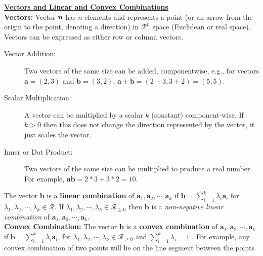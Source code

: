 %

\underline{\bf Vectors and Linear and Convex Combinations} \\

{\bf Vectors:} Vector $\bf n$ has ${n}$-elements and represents a point (or an arrow from the origin to the point, denoting a direction) in $\mathcal{R}^n$ space (Euclidean or real space). Vectors can be expressed as either row or column vectors. \vspace{-2mm}
\begin{description}
\item[Vector Addition:] Two vectors of the same size can be added, componentwise, e.g., for vectors
$\mathbf{a}=(2,3)$ and $\mathbf{b} = (3,2)$,  $\mathbf{a} + \mathbf{b} = (2+3,3+2) = (5,5)$. \vspace{-2mm}
\item[Scalar Multiplication:] A vector can be multiplied by a scalar $k$ (constant) component-wise. If $k > 0$ then this does not change the direction represented by the vector, it just scales the vector. \vspace{-2mm}
\item[Inner or Dot Product:] Two vectors of the same size can be multiplied to produce a real number.  For example, $\mathbf{a}\mathbf{b} = 2*3 + 3*2 = 10$.
\end{description} 

  The vector ${\mathbf b}$ is a {\bf linear combination} of ${\mathbf a_1}, {\mathbf a_2}, \cdots, {\mathbf a_k}$ if ${\mathbf b} = \sum_{i=1}^k \lambda_i {\mathbf a_i}$ for $\lambda_1, \lambda_2,\cdots, \lambda_k \in \mathcal{R}$. If $\lambda_1, \lambda_2,\cdots,\lambda_k \in \mathcal{R}_{\ge 0}$ then ${\mathbf b}$ is a {\it non-negative linear combination} of ${\mathbf a_1},{\mathbf a_2},\cdots,{\mathbf a_k}$. \\

{\bf Convex Combination:}  The vector ${\mathbf b}$ is a {\bf convex combination} of ${\mathbf a_1},{\mathbf a_2},\cdots,{\mathbf a_k}$ if ${\mathbf b} = \sum_{i=1}^k \lambda_i {\mathbf a_i}$, for $\lambda_1, \lambda_2,\cdots,\lambda_k \in \mathcal{R}_{\ge 0}$ and $\sum_{i=1}^k \lambda_i = 1$ . For example, any convex combination of two points will lie on the line segment between the points. \\

